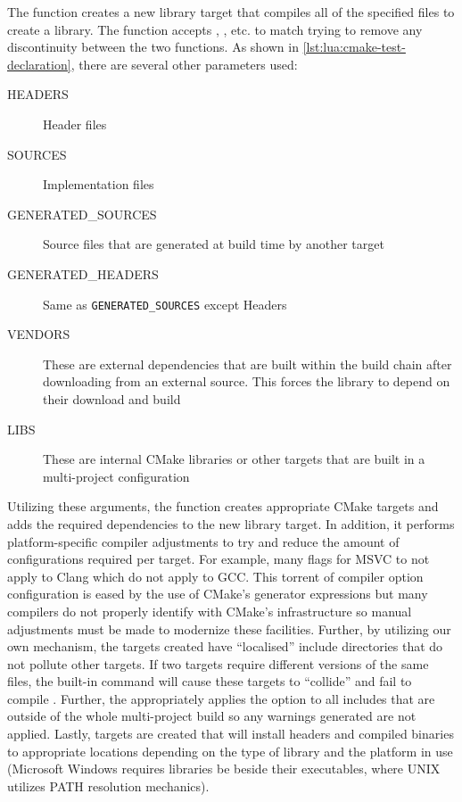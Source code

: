 The function  creates a new library target that compiles all of the specified files to create a library. The function accepts , , etc. to match \cite{CMake:add_library} trying to remove any discontinuity between the two functions. As shown in \cref{lst:lua:cmake-test-declaration}, there are several other parameters used: 
\begin{description}
    \item[HEADERS] Header files
    \item[SOURCES] Implementation files
    \item[GENERATED\_SOURCES] Source files that are generated at build time by another target
    \item[GENERATED\_HEADERS] Same as \verb|GENERATED_SOURCES| except Headers
    \item[VENDORS] These are external dependencies that are built within the build chain after downloading from an external source. This forces the library to depend on their download and build
    \item[LIBS] These are internal CMake libraries or other targets that are built in a multi-project configuration
\end{description}
Utilizing these arguments, the function creates appropriate CMake targets and adds the required dependencies to the new library target. In addition, it performs platform-specific compiler adjustments to try and reduce the amount of configurations required per target. For example, many flags for MSVC to not apply to Clang which do not apply to GCC. This torrent of compiler option configuration is eased by the use of CMake's generator expressions \cite{CMake:generator-expressions} but many compilers do not properly identify with CMake's infrastructure so manual adjustments must be made to modernize these facilities. Further, by utilizing our own mechanism, the targets created have ``localised'' include directories that do not pollute other targets. If two targets require different versions of the same files, the built-in  command will cause these targets to ``collide'' and fail to compile \cite{CMake:include-directories}. Further, the  appropriately applies the  option to all includes that are outside of the whole multi-project build so any warnings generated are not applied. Lastly,  targets are created that will install headers and compiled binaries to appropriate locations depending on the type of library and the platform in use (Microsoft Windows requires libraries be beside their executables, where UNIX utilizes PATH resolution mechanics).

